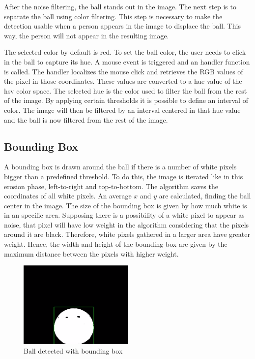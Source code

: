 After the noise filtering, the ball stands out in the image. The next step is to separate the ball using color filtering. This step is necessary to make the detection usable when a person appears in the image to displace the ball. This way, the person will not appear in the resulting image.

The selected color by default is red. To set the ball color, the user needs to click in the ball to capture its hue. A mouse event is triggered and an handler function is called. The handler localizes the mouse click and retrieves the RGB values of the pixel in those coordinates. These values are converted to a hue value of the \gls{hsv} color space. The selected hue is the color used to filter the ball from the rest of the image. By applying certain thresholds it is possible to define an interval of color. The image will then be filtered by an interval centered in that hue value and the ball is now filtered from the rest of the image. 


\subsection{Bounding Box}

A bounding box is drawn around the ball if there is a number of white pixels bigger than a predefined threshold. To do this, the image is iterated like in this erosion phase, left-to-right and top-to-bottom. The algorithm saves the coordinates of all white pixels. An average $x$ and $y$ are calculated, finding the ball center in the image. The size of the bounding box is given by how much white is in an specific area. Supposing there is a possibility of a white pixel to appear as noise, that pixel will have low weight in the algorithm considering that the pixels around it are black. Therefore, white pixels gathered in a larger area have greater weight. Hence, the width and height of the bounding box are given by the maximum distance between the pixels with higher weight.


\begin{figure}[htp]
	
	\centering
	\includegraphics[width=0.5\textwidth]{capcalib/imgs/ball_detect.png}
	
	\caption{Ball detected with bounding box}
	\label{fig:balldetect}
	
\end{figure}


